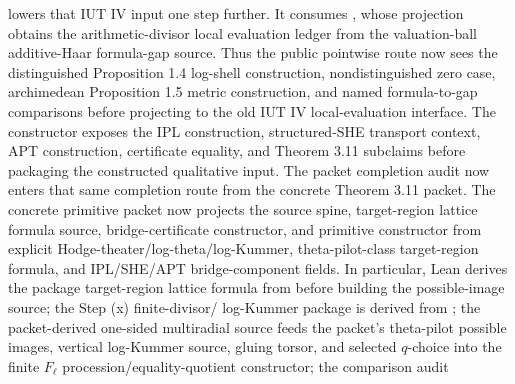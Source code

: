 \begin{proposition}
  lowers that IUT IV input one step further.  It consumes
  ,
  whose projection
  obtains the arithmetic-divisor local evaluation ledger from the
  valuation-ball additive-Haar formula-gap source.  Thus the public pointwise
  route now sees the distinguished Proposition 1.4 log-shell construction,
  nondistinguished zero case, archimedean Proposition 1.5 metric construction,
  and named formula-to-gap comparisons before projecting to the old IUT IV
  local-evaluation interface.
  The constructor exposes the IPL construction,
  structured-SHE transport context, APT construction, certificate equality, and
  Theorem 3.11 subclaims before packaging the constructed qualitative input.
  The packet completion audit
  now enters that same completion route from the concrete Theorem 3.11 packet.
  The concrete primitive packet
  now projects the source spine, target-region lattice formula source,
  bridge-certificate constructor, and primitive constructor from explicit
  Hodge-theater/log-theta/log-Kummer, theta-pilot-class target-region formula,
  and IPL/SHE/APT bridge-component fields.  In particular, Lean derives the
  package target-region lattice formula from
  before building the possible-image source; the Step (x) finite-divisor/
  log-Kummer package is derived from
  ;
  the packet-derived one-sided multiradial source
  feeds the packet's theta-pilot possible images, vertical log-Kummer source,
  gluing torsor, and selected \(q\)-choice into the finite \(F_\ell\)
  procession/equality-quotient constructor; the comparison audit

\end{proposition}
